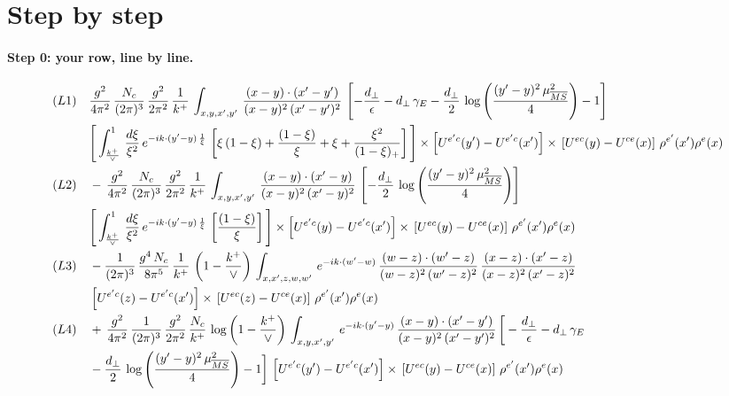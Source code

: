 \documentclass[10pt]{article}
\numberwithin{equation}{section}
\begin{document}
\section{Step by step}
\paragraph{Step 0: your row, line by line.}
\begin{align}
(L1)\quad &   \frac{g^{2}}{4\pi^{2}}\, \frac{N_{c}}{(2\pi)^{3}}\,\frac{g^{2}}{2\pi^{2}}\, \frac{1}{k^{+}}\,\int_{x,y,x',y'}\,\frac{(x-y)\cdot (x'-y')}{(x-y)^{2}\,(x'-y')^{2}}\,\left[-\frac{d_{\perp}}{\epsilon}-d_{\perp}\,\gamma_{E}-\frac{d_{\perp}}{2}\,\log{\left(\frac{(y'-y)^{2}\,\mu^{2}_{\overline{MS}}}{4}\right)}-1\right]\,\notag \\ & \Bigg[\int_{\frac{k^{+}}{\vee}}^{1}\,\frac{d\xi}{\xi^{2}}\,e^{-ik\cdot (y'-y)\,\frac{1}{\xi}}\,\left[\xi\,(1-\xi)+\frac{(1-\xi)}{\xi}+\xi+\frac{\xi^{2}}{(1-\xi)_{+}}\right]\Bigg]\times \left[U^{e'c}(y') - U^{e'c}(x')\right] \times\, \left[U^{ec}(y) - U^{ce}(x)\right]\, \rho^{e'}(x') \rho^{e}(x)\notag\\
(L2)\quad&   -\,\frac{g^{2}}{4\pi^{2}}\, \frac{N_{c}}{(2\pi)^{3}}\,\frac{g^{2}}{2\pi^{2}}\, \frac{1}{k^{+}}\,\int_{x,y,x',y'}\,\frac{(x-y)\cdot (x'-y)}{(x-y)^{2}\,(x'-y)^{2}}\,\left[-\frac{d_{\perp}}{2}\,\log{\left(\frac{(y'-y)^{2}\,\mu^{2}_{\overline{MS}}}{4}\right)}\right]\,\notag \\ &  \Bigg[\int_{\frac{k^{+}}{\vee}}^{1}\,\frac{d\xi}{\xi^{2}}\,e^{-ik\cdot (y'-y)\,\frac{1}{\xi}}\,\left[\frac{(1-\xi)}{\xi}\right]\Bigg]\times \left[U^{e'c}(y) - U^{e'c}(x')\right] \times\, \left[U^{ec}(y) - U^{ce}(x)\right]\, \rho^{e'}(x') \rho^{e}(x)\notag\\
(L3)\quad&   -\frac{1}{(2\pi)^{3}}\,\frac{g^{4}\,N_{c}}{8\pi^{5}}\,\frac{1}{k^{+}}\,\left(1-\frac{k^{+}}{\vee}\right)\,\int_{x,x',z,w,w'}\,e^{-ik\cdot (w'-w)}\,\frac{(w-z)\cdot(w'-z)}{(w-z)^{2}\,(w'-z)^{2}}\,\frac{(x-z)\cdot(x'-z)}{(x-z)^{2}\,(x'-z)^{2}}\notag\\
& \left[U^{e'c}(z) - U^{e'c}(x')\right] \times\, \left[U^{ec}(z) - U^{ce}(x)\right]\, \rho^{e'}(x') \rho^{e}(x)\notag\\
(L4)\quad&  +\, \frac{g^{2}}{4\pi^{2}}\, \frac{1}{(2\pi)^{3}}\,\frac{g^{2}}{2\pi^{2}}\, \frac{N_{c}}{k^{+}}\,\log{\left(1-\frac{k^{+}}{\vee}\right)}\,\int_{x,y,x',y'}\,e^{-ik\cdot (y'-y)}\,\frac{(x-y)\cdot (x'-y')}{(x-y)^{2}\,(x'-y')^{2}}\,\bigg[-\frac{d_{\perp}}{\epsilon}-d_{\perp}\,\gamma_{E}\notag \\ & -\frac{d_{\perp}}{2}\,\log{\left(\frac{(y'-y)^{2}\,\mu^{2}_{\overline{MS}}}{4}\right)}-1\bigg]\,\left[U^{e'c}(y') - U^{e'c}(x')\right] \times\, \left[U^{ec}(y) - U^{ce}(x)\right]\, \rho^{e'}(x') \rho^{e}(x)\notag\\

\end{align}
\end{document}
